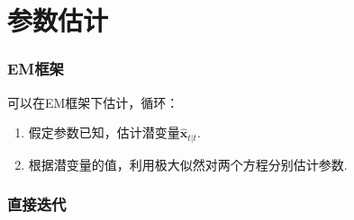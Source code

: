\section{参数估计}
\subsubsection{EM框架}
可以在EM框架下估计，循环：

\begin{enumerate}
\item 假定参数已知，估计潜变量$\hat{\bm{x}}_{t|t}$.
\item 根据潜变量的值，利用极大似然对两个方程分别估计参数.
\end{enumerate}

\subsubsection{直接迭代}

